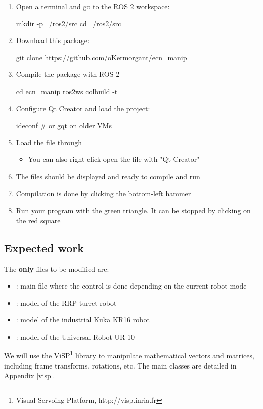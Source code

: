 \documentclass{ecnreport}
\begin{document}
  \begin{enumerate}
    \item Open a terminal and go to the ROS 2 workspace:
    \begin{bashcodelarge}
mkdir -p ~/ros2/src
cd ~/ros2/src
    \end{bashcodelarge}
    \item Download this package:
\begin{bashcodelarge}
git clone https://github.com/oKermorgant/ecn_manip
\end{bashcodelarge}
\item Compile the package with ROS 2
 \begin{bashcodelarge}
cd ecn_manip
ros2ws
colbuild -t
\end{bashcodelarge}
\item Configure Qt Creator and load the project:
 \begin{bashcodelarge}
ideconf # or gqt on older VMs
\end{bashcodelarge}
    \item Load the  file through 
    \begin{itemize}
     \item You can also right-click open the file with "Qt Creator"
    \end{itemize}
    \item The files should be displayed and ready to compile and run
    \item Compilation is done by clicking the bottom-left hammer
    \item Run your program with the green triangle. It can be stopped by clicking on the red square
  \end{enumerate}
  
  \subsection{Expected work}
  
  The {\bf only} files to be modified are:
  \begin{itemize}
    \item {}: main file where the control is done depending on the current robot mode
    \item {}: model of the RRP turret robot
    \item {}: model of the industrial Kuka KR16 robot
    \item {}: model of the Universal Robot UR-10
  \end{itemize}
  We will use the ViSP\footnote{Visual Servoing Platform, http://visp.inria.fr} library to manipulate mathematical vectors and matrices, including frame transforms, rotations, etc. The main classes are detailed in Appendix \ref{visp}.\\
\end{document}
